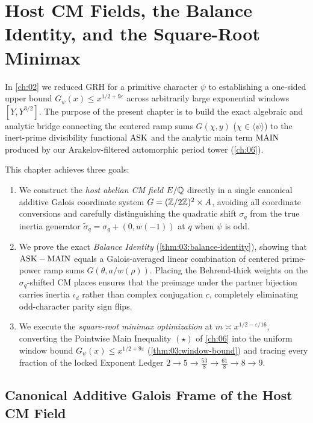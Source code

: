 \chapter{Host CM Fields, the Balance Identity, and the Square-Root Minimax}
\label{ch:03}

In \cref{ch:02} we reduced GRH for a primitive character $\psi$ to establishing a one-sided upper bound $G_\psi(x) \le x^{1/2 + 9\varepsilon}$ across arbitrarily large exponential windows $[Y, Y^{3/2}]$. The purpose of the present chapter is to build the exact algebraic and analytic bridge connecting the centered ramp sums $G(\chi, y)$ ($\chi \in \langle \psi \rangle$) to the inert-prime divisibility functional $\mathrm{ASK}$ and the analytic main term $\mathrm{MAIN}$ produced by our Arakelov-filtered automorphic period tower (\cref{ch:06}).

This chapter achieves three goals:
\begin{enumerate}[label=(\roman*)]
\item We construct the \emph{host abelian CM field} $E/\mathbb{Q}$ directly in a single canonical additive Galois coordinate system $G = (\mathbb{Z}/2\mathbb{Z})^2 \times A$, avoiding all coordinate conversions and carefully distinguishing the quadratic shift $\sigma_q$ from the true inertia generator $\widetilde{\sigma}_q = \sigma_q + (0, w(-1))$ at $q$ when $\psi$ is odd.
\item We prove the exact \emph{Balance Identity} (\cref{thm:03:balance-identity}), showing that $\mathrm{ASK} - \mathrm{MAIN}$ equals a Galois-averaged linear combination of centered prime-power ramp sums $G(\theta, a/w(\rho))$. Placing the Behrend-thick weights on the $\sigma_q$-shifted CM places ensures that the preimage under the partner bijection carries inertia $\iota_d$ rather than complex conjugation $c$, completely eliminating odd-character parity sign flips.
\item We execute the \emph{square-root minimax optimization} at $m \asymp x^{1/2 - \varepsilon/16}$, converting the Pointwise Main Inequality $(\star)$ of \cref{ch:06} into the uniform window bound $G_\psi(x) \le x^{1/2 + 9\varepsilon}$ (\cref{thm:03:window-bound}) and tracing every fraction of the locked Exponent Ledger $2 \to 5 \to \frac{53}{8} \to \frac{61}{8} \to 8 \to 9$.
\end{enumerate}

\section{Canonical Additive Galois Frame of the Host CM Field}
\label{sec:03:canonical-frame}

